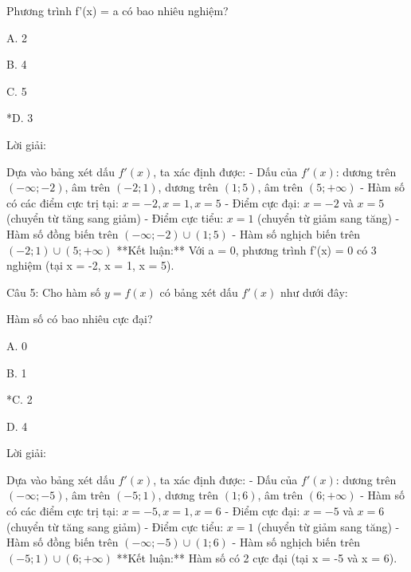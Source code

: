 \documentclass[a4paper,12pt]{article}
\begin{document}
Phương trình f'(x) = a có bao nhiêu nghiệm?

A. 2

B. 4

C. 5

*D. 3

Lời giải:

Dựa vào bảng xét dấu \(f'(x)\), ta xác định được: - Dấu của \(f'(x)\): dương trên \((-\infty; -2)\), âm trên \((-2; 1)\), dương trên \((1; 5)\), âm trên \((5; +\infty)\) - Hàm số có các điểm cực trị tại: \(x = -2, x = 1, x = 5\) - Điểm cực đại: \(x = -2\) và \(x = 5\) (chuyển từ tăng sang giảm) - Điểm cực tiểu: \(x = 1\) (chuyển từ giảm sang tăng) - Hàm số đồng biến trên \((-\infty; -2) \cup (1; 5)\) - Hàm số nghịch biến trên \((-2; 1) \cup (5; +\infty)\) **Kết luận:** Với a = 0, phương trình f'(x) = 0 có 3 nghiệm (tại x = -2, x = 1, x = 5).



Câu 5: Cho hàm số \(y=f(x)\) có bảng xét dấu \(f'(x)\) như dưới đây:


Hàm số có bao nhiêu cực đại?

A. 0

B. 1

*C. 2

D. 4

Lời giải:

Dựa vào bảng xét dấu \(f'(x)\), ta xác định được: - Dấu của \(f'(x)\): dương trên \((-\infty; -5)\), âm trên \((-5; 1)\), dương trên \((1; 6)\), âm trên \((6; +\infty)\) - Hàm số có các điểm cực trị tại: \(x = -5, x = 1, x = 6\) - Điểm cực đại: \(x = -5\) và \(x = 6\) (chuyển từ tăng sang giảm) - Điểm cực tiểu: \(x = 1\) (chuyển từ giảm sang tăng) - Hàm số đồng biến trên \((-\infty; -5) \cup (1; 6)\) - Hàm số nghịch biến trên \((-5; 1) \cup (6; +\infty)\) **Kết luận:** Hàm số có 2 cực đại (tại x = -5 và x = 6).
\end{document}
